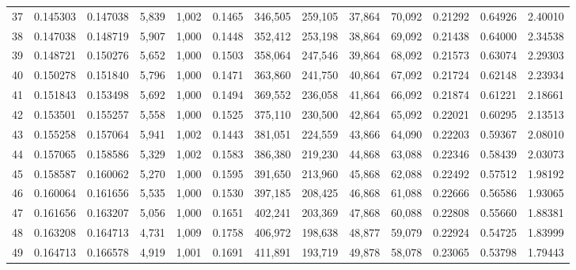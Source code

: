 \begin{tabular}{rrrrrrrrrrrrr}
37  &  0.145303 &  0.147038 &   5,839 &  1,002 &                                     0.1465 &  346,505 &  259,105 &   37,864 &   70,092 &  0.21292 &  0.64926 &  2.40010 \\
38  &  0.147038 &  0.148719 &   5,907 &  1,000 &                                     0.1448 &  352,412 &  253,198 &   38,864 &   69,092 &  0.21438 &  0.64000 &  2.34538 \\
39  &  0.148721 &  0.150276 &   5,652 &  1,000 &                                     0.1503 &  358,064 &  247,546 &   39,864 &   68,092 &  0.21573 &  0.63074 &  2.29303 \\
40  &  0.150278 &  0.151840 &   5,796 &  1,000 &                                     0.1471 &  363,860 &  241,750 &   40,864 &   67,092 &  0.21724 &  0.62148 &  2.23934 \\
41  &  0.151843 &  0.153498 &   5,692 &  1,000 &                                     0.1494 &  369,552 &  236,058 &   41,864 &   66,092 &  0.21874 &  0.61221 &  2.18661 \\
42  &  0.153501 &  0.155257 &   5,558 &  1,000 &                                     0.1525 &  375,110 &  230,500 &   42,864 &   65,092 &  0.22021 &  0.60295 &  2.13513 \\
43  &  0.155258 &  0.157064 &   5,941 &  1,002 &                                     0.1443 &  381,051 &  224,559 &   43,866 &   64,090 &  0.22203 &  0.59367 &  2.08010 \\
44  &  0.157065 &  0.158586 &   5,329 &  1,002 &                                     0.1583 &  386,380 &  219,230 &   44,868 &   63,088 &  0.22346 &  0.58439 &  2.03073 \\
45  &  0.158587 &  0.160062 &   5,270 &  1,000 &                                     0.1595 &  391,650 &  213,960 &   45,868 &   62,088 &  0.22492 &  0.57512 &  1.98192 \\
46  &  0.160064 &  0.161656 &   5,535 &  1,000 &                                     0.1530 &  397,185 &  208,425 &   46,868 &   61,088 &  0.22666 &  0.56586 &  1.93065 \\
47  &  0.161656 &  0.163207 &   5,056 &  1,000 &                                     0.1651 &  402,241 &  203,369 &   47,868 &   60,088 &  0.22808 &  0.55660 &  1.88381 \\
48  &  0.163208 &  0.164713 &   4,731 &  1,009 &                                     0.1758 &  406,972 &  198,638 &   48,877 &   59,079 &  0.22924 &  0.54725 &  1.83999 \\
49  &  0.164713 &  0.166578 &   4,919 &  1,001 &                                     0.1691 &  411,891 &  193,719 &   49,878 &   58,078 &  0.23065 &  0.53798 &  1.79443 \\

\end{tabular}
